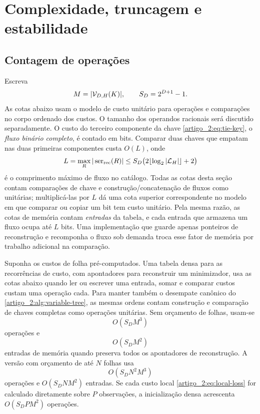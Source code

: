 \section{Complexidade, truncagem e estabilidade}
\label{artigo_2:sec:complexity-dp}

\subsection{Contagem de operações}

Escreva
\[
 M=|\mathcal{V}_{D,H}(K)|,\qquad S_D=2^{D+1}-1.
\]
As cotas abaixo usam o modelo de custo unitário para operações e comparações
no corpo ordenado dos custos. O tamanho dos operandos racionais será discutido
separadamente. O custo do terceiro componente da chave \eqref{artigo_2:eq:tie-key}, o
\emph{fluxo binário completo}, é contado em bits. Comparar duas
chaves que empatam nas duas primeiras componentes custa
$O(L)$, onde
\begin{equation}
 L=\max_R|\operatorname{ser}_{\rm rec}(R)|
 \le S_D\bigl(2\lfloor\log_2|\mathcal{L}_H|\rfloor+2\bigr)
 \label{artigo_2:eq:stream-length}
\end{equation}
é o comprimento máximo de fluxo no catálogo. Todas as cotas desta seção contam
comparações de chave e construção/concatenação de fluxos como unitárias;
multiplicá-las por $L$ dá uma cota superior correspondente no modelo em que
comparar ou copiar um bit tem custo unitário.
Pela mesma razão, as cotas de memória contam \emph{entradas} da tabela, e cada
entrada que armazena um fluxo ocupa até $L$ bits. Uma implementação que
guarde apenas ponteiros de reconstrução e recomponha o fluxo sob demanda
troca esse fator de memória por trabalho adicional na comparação.

\begin{theorem}\label{map:artigo_2:9.1}
\label{artigo_2:thm:state-complexity}
Suponha os custos de folha pré-computados. Uma tabela densa para as
recorrências de custo, com apontadores para reconstruir um minimizador,
usa as cotas abaixo quando ler ou escrever uma entrada, somar e comparar
custos custam uma operação cada. Para manter também o desempate canônico do
\cref{artigo_2:alg:variable-tree}, as mesmas ordens contam construção e
comparação de chaves completas como operações unitárias. Sem orçamento de folhas, usam-se
\begin{equation}
 O(S_DM^3)
 \label{artigo_2:eq:dense-time}
\end{equation}
operações e
\begin{equation}
 O(S_DM^2)
 \label{artigo_2:eq:dense-memory}
\end{equation}
entradas de memória quando preserva todos os apontadores de reconstrução.
A versão com orçamento de até $N$ folhas usa
\begin{equation}
 O(S_DN^2M^3)
 \label{artigo_2:eq:budget-time}
\end{equation}
operações e $O(S_DNM^2)$ entradas. Se cada custo local
\eqref{artigo_2:eq:local-loss} for calculado diretamente sobre $P$ observações, a
inicialização densa acrescenta $O(S_DPM^2)$ operações.
\end{theorem}

